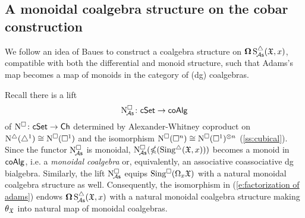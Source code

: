\subsection{A monoidal coalgebra structure on the cobar construction}

We follow an idea of Baues to construct a coalgebra structure on $\cobar \sSchainsA(\fX,x)$, compatible with both the differential and monoid structure, such that Adams's map becomes a map of monoids in the category of (dg) coalgebras.  

Recall there is a lift 
\[\cchainsA \colon \cSet \to \coAlg\] of $\cchains \colon \cSet \to \Ch$ determined by Alexander-Whitney coproduct on $\schains(\simplex^1) \cong \cchains(\cube^1)$ and the isomorphism $\cchains(\cube^n)\cong \cchains(\cube^1)^{\otimes n}$ (\cref{ss:cubical}). Since the functor $\cchainsA$ is monoidal, $\cchainsA( \ccobar(\sSing(\fX,x)))$ becomes a monoid in $\coAlg$, i.e. a \textit{monoidal coalgebra} or, equivalently, an associative coassociative dg bialgebra. Similarly, the lift $\cchainsA$ equips $\cSing(\loops_x \fX)$ with a natural monoidal coalgebra structure as well. Consequently, the isomorphism in (\ref{e:factorization of adams}) endows $\cobar \sSchainsA(\fX,x)$ with a natural monoidal coalgebra structure making $\theta_\fX$ into natural map of monoidal coalgebras. 